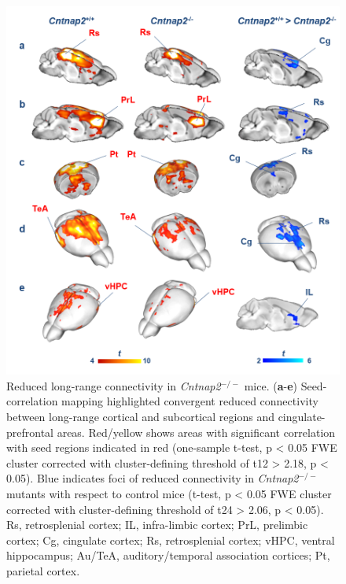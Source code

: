 \begin{figure}[th] 
    \centering
    \includegraphics[scale=0.7]{figures/cntnap2_figure_02.png}
    \decoRule
    \caption[Reduced long-range connectivity in \textit{Cntnap2}$^{-/-}$ mice.]{Reduced
    long-range connectivity in \textit{Cntnap2}$^{-/-}$ mice. (\textbf{a}-\textbf{e})
    Seed-correlation mapping highlighted convergent reduced connectivity between
    long-range cortical and subcortical regions and cingulate-prefrontal areas.
    Red/yellow shows areas with significant correlation with seed regions
    indicated in red (one-sample t-test, p < 0.05 FWE cluster corrected with
    cluster-defining threshold of t12 > 2.18, p < 0.05). Blue indicates foci of
    reduced connectivity in \textit{Cntnap2}$^{-/-}$ mutants with respect to control mice
    (t-test, p < 0.05 FWE cluster corrected with cluster-defining threshold of
    t24 > 2.06, p < 0.05).  Rs, retrosplenial cortex; IL, infra-limbic cortex;
    PrL, prelimbic cortex; Cg, cingulate cortex; Rs, retrosplenial cortex; vHPC,
    ventral hippocampus; Au/TeA, auditory/temporal association cortices; Pt,
    parietal cortex.}
    \label{fig:cntnap2_fig02}
\end{figure}

